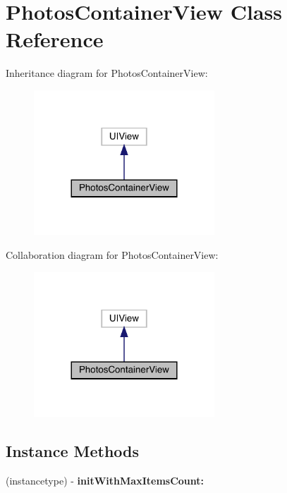 \hypertarget{interface_photos_container_view}{}\section{Photos\+Container\+View Class Reference}
\label{interface_photos_container_view}


Inheritance diagram for Photos\+Container\+View\+:\nopagebreak
\begin{figure}[H]
\begin{center}
\leavevmode
\includegraphics[width=192pt]{interface_photos_container_view__inherit__graph}
\end{center}
\end{figure}


Collaboration diagram for Photos\+Container\+View\+:\nopagebreak
\begin{figure}[H]
\begin{center}
\leavevmode
\includegraphics[width=192pt]{interface_photos_container_view__coll__graph}
\end{center}
\end{figure}
\subsection*{Instance Methods}
\begin{DoxyCompactItemize}
\item 
(instancetype) -\/ {\bfseries init\+With\+Max\+Items\+Count\+:}
\end{DoxyCompactItemize}
